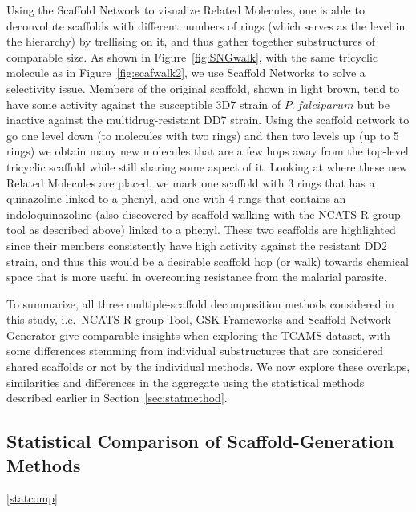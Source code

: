 \documentclass[journal=jacsat,manuscript=article]{achemso}
\newcommand*\fref[1]{Figure~\ref{fig:#1}}
\newcommand*\sref[1]{Section~\ref{sec:#1}}
\newcommand*\ie{i.e.~}
\begin{document}
Using the Scaffold Network to visualize Related Molecules, one is able to deconvolute scaffolds with different numbers of rings (which serves as the level in the hierarchy) by trellising on it, and thus gather together substructures of comparable size. As shown in \fref{SNGwalk}, with the same tricyclic molecule as in \fref{scafwalk2}, we use Scaffold Networks to solve a selectivity issue. Members of the original scaffold, shown in light brown, tend to have some activity against the susceptible 3D7 strain of $P.~falciparum$ but be inactive against the multidrug-resistant DD7 strain. Using the scaffold network to go one level down (to molecules with two rings) and then two levels up (up to 5 rings) we obtain many new molecules that are a few hops away from the top-level tricyclic scaffold while still sharing some aspect of it. Looking at where these new Related Molecules are placed, we mark one scaffold with 3 rings that has a quinazoline linked to a phenyl, and one with 4 rings that contains an indoloquinazoline (also discovered by scaffold walking with the NCATS R-group tool as described above) linked to a phenyl. These two scaffolds are highlighted since their members consistently have high activity against the resistant DD2 strain, and thus this would be a desirable scaffold hop (or walk) towards chemical space that is more useful in overcoming resistance from the malarial parasite.  

To summarize, all three multiple-scaffold decomposition methods considered in this study, \ie NCATS R-group Tool, GSK Frameworks  and Scaffold Network Generator give comparable insights when exploring the TCAMS dataset, with some differences stemming from individual substructures that are considered shared scaffolds or not by the individual methods.  We now explore these overlaps, similarities and differences in the aggregate using the statistical methods described earlier in \sref{statmethod}.

\subsection{Statistical Comparison of Scaffold-Generation Methods}\ref{statcomp}
\end{document}
